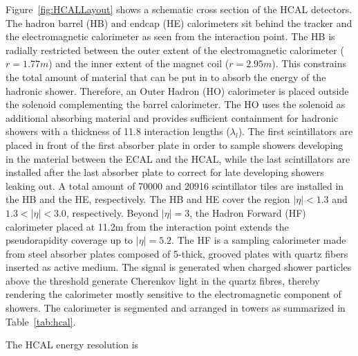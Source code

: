 Figure~\ref{fig:HCALLayout} shows a schematic cross section of the HCAL detectors. The hadron barrel (HB) and endcap (HE) calorimeters sit behind the tracker and the electromagnetic calorimeter as seen from the interaction point. The HB is radially restricted between the outer extent of the electromagnetic calorimeter ($r = 1.77\unit{m}$) and the inner extent of the magnet coil ($r = 2.95\unit{m}$). This constrains the total amount of material that can be put in to absorb the energy of the hadronic shower. Therefore, an Outer Hadron (HO) calorimeter is placed outside the solenoid complementing the barrel calorimeter. The HO uses the solenoid as additional absorbing material and provides sufficient containment for hadronic showers with a thickness of 11.8 interaction lengths ($\lambda_l$). The first scintillators are placed in front of the first absorber plate in order to sample showers developing in the material between the ECAL and the HCAL, while the last scintillators are installed after the last absorber plate to correct for late developing showers leaking out. A total amount of 70000 and 20916 scintillator tiles are installed in the HB and the HE, respectively. The HB and HE cover the region $|\eta| < 1.3$ and $1.3 < |\eta| < 3.0$, respectively.  Beyond $|\eta| = 3$, the Hadron Forward (HF) calorimeter placed at 11.2\unit{m} from the interaction point extends the pseudorapidity coverage up to $|\eta| = 5.2$. The HF is a sampling calorimeter made from steel absorber plates composed of 5\mm-thick, grooved plates with quartz fibers inserted as active medium. The signal is generated when charged shower particles above the threshold generate Cherenkov light in the quartz fibres, thereby rendering the calorimeter mostly sensitive to the electromagnetic component of showers.
The calorimeter is segmented and arranged in towers as summarized in Table~\ref{tab:hcal}.

The HCAL energy resolution is 

